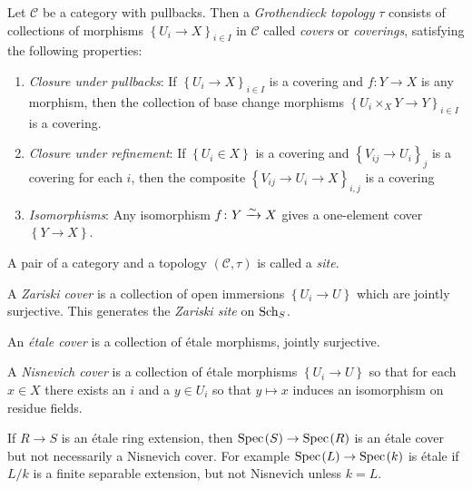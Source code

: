 \documentclass[11pt]{amsart}
\begin{document}
\begin{definition} Let $\mathscr{C}$ be a category with pullbacks. Then a \textit{Grothendieck topology} $\tau$ consists of collections of morphisms $\left\{ U_i \to X \right\}_{i\in I}$ in $\mathscr{C}$ called \textit{covers} or \textit{coverings}, satisfying the following properties:
\begin{enumerate}
    \item \textit{Closure under pullbacks}: If $\left\{ U_i \to X \right\}_{i\in I}$ is a covering and $f \colon Y \to X$ is any morphism, then the collection of base change morphisms $\left\{ U_i \times_X Y \to Y \right\}_{i\in I}$ is a covering.
    \item \textit{Closure under refinement}: If $\left\{ U_i \in X \right\}$ is a covering and $\left\{ V_{ij} \to U_i \right\}_j$ is a covering for each $i$, then the composite $\left\{ V_{ij} \to U_i \to X \right\}_{i,j}$ is a covering
    \item \textit{Isomorphisms}: Any isomorphism $f\colon Y \xrightarrow{\sim} X$ gives a one-element cover $\left\{ Y \to X \right\}$.
\end{enumerate}
A pair of a category and a topology $(\mathscr{C},\tau)$ is called a \textit{site}.
\end{definition}

\begin{example} A \textit{Zariski cover} is a collection of open immersions $\left\{ U_i \to U \right\}$ which are jointly surjective. This generates the \textit{Zariski site} on $\mathrm{Sch}_S$.
\end{example}

\begin{example} An \textit{\'etale cover} is a collection of \'etale morphisms, jointly surjective.
\end{example}

\begin{example} A \textit{Nisnevich cover} is a collection of \'etale morphisms $\left\{ U_i \to U \right\}$ so that for each $x\in X$ there exists an $i$ and a $y\in U_i$ so that $y\mapsto x$ induces an isomorphism on residue fields.
\end{example}

\begin{note} If $R\to S$ is an \'etale ring extension, then $\text{Spec}\hspace{0.1em}(S) \to \text{Spec}\hspace{0.1em}(R)$ is an \'etale cover but not necessarily a Nisnevich cover. For example $\text{Spec}\hspace{0.1em}(L) \to \text{Spec}\hspace{0.1em}(k)$ is \'etale if $L/k$ is a finite separable extension, but not Nisnevich unless $k=L$.
\end{note}
\end{document}
